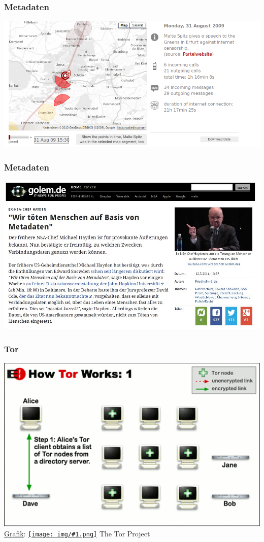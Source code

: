 \documentclass[12pt]{beamer}
\newcommand{\cc}[1]{\texttt{[image: img/\#1.png]}\hspace{1mm}}
\begin{document}
\begin{frame}
    \frametitle{Metadaten}
    \includegraphics[height=0.7\textheight]{img/maltespitz.png}
\end{frame}

\begin{frame}
    \frametitle{Metadaten}
    \includegraphics[height=0.7\textheight]{img/wekillpeople.jpg}
\end{frame}

\begin{frame}
    \frametitle{Tor}
    \includegraphics[height=0.7\textheight]{img/tor1.png}
    \\{\small \href{https://www.torproject.org/images/htw1.png}{Grafik}: \href{https://creativecommons.org/licenses/by/3.0/us/}{\cc{by}} The Tor Project}
\end{frame}
\end{document}
